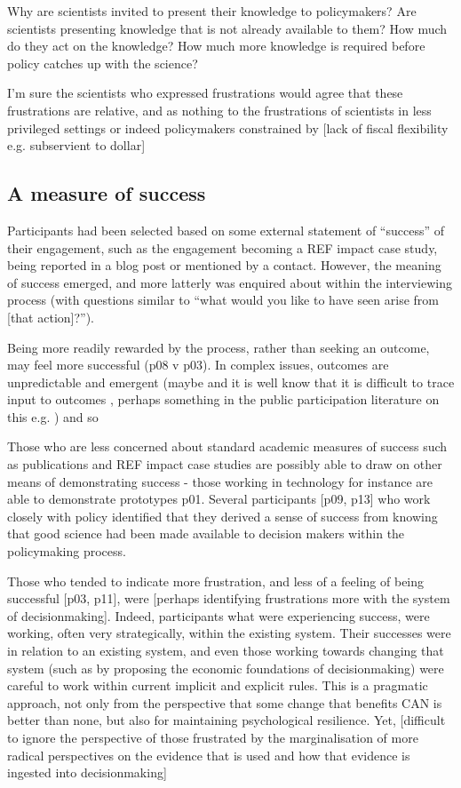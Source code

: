 Why are scientists invited to present their knowledge to policymakers? Are scientists presenting knowledge that is not already available to them? How much do they act on the knowledge? How much more knowledge is required before policy catches up with the science?

I'm sure the scientists who expressed frustrations would agree that these frustrations are relative, and as nothing to the frustrations of scientists in less privileged settings or indeed policymakers constrained by [lack of fiscal flexibility e.g. subservient to dollar]

\subsection{A measure of success}
Participants had been selected based on some external statement of ``success'' of their engagement, such as the engagement becoming a REF impact case study, being reported in a blog post or mentioned by a contact. However, the meaning of success emerged, and more latterly was enquired about within the interviewing process (with questions similar to ``what would you like to have seen arise from [that action]?'').

Being more readily rewarded by the process, rather than seeking an outcome, may feel more successful (p08 v p03). In complex issues, outcomes are unpredictable and emergent (maybe \cite{SnowdenB2007} and it is well know that it is difficult to trace input to outcomes \cite{BednarekSHG2015}, perhaps something in the public participation literature on this e.g. \cite{Sprain2016}) and so 

Those who are less concerned about standard academic measures of success such as publications and REF impact case studies are possibly able to draw on other means of demonstrating success - those working in technology for instance are able to demonstrate prototypes p01. Several participants [p09, p13] who work closely with policy identified that they derived a sense of success from knowing that good science had been made available to decision makers within the policymaking process.

Those who tended to indicate more frustration, and less of a feeling of being successful [p03, p11], were [perhaps identifying frustrations more with the system of decisionmaking]. Indeed, participants what were experiencing success, were working, often very strategically, within the existing system. Their successes were in relation to an existing system, and even those working towards changing that system (such as by proposing the economic foundations of decisionmaking) were careful to work within current implicit and explicit rules. This is a pragmatic approach, not only from the perspective that some change that benefits CAN is better than none, but also for maintaining psychological resilience. Yet, [difficult to ignore the perspective of those frustrated by the marginalisation of more radical perspectives on the evidence that is used and how that evidence is ingested into decisionmaking]  

